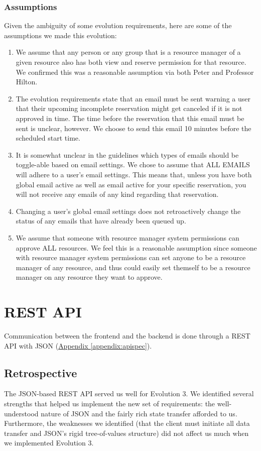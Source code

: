 \documentclass[12pt]{article}
\begin{document}
\subsubsection{Assumptions}
Given the ambiguity of some evolution requirements, here are some of the assumptions we made this evolution:
\begin{enumerate}
    \item We assume that any person or any group that is a resource manager of a given resource also has both view and reserve permission for that resource. We confirmed this was a reasonable assumption via both Peter and Professor Hilton. 
    \item The evolution requirements state that an email must be sent warning a user that their upcoming incomplete reservation might get canceled if it is not approved in time. The time before the reservation that this email must be sent is unclear, however. We choose to send this email 10 minutes before the scheduled start time. 
    \item It is somewhat unclear in the guidelines which types of emails should be toggle-able based on email settings. We chose to assume that ALL EMAILS will adhere to a user's email settings. This means that, unless you have both global email active as well as email active for your specific reservation, you will not receive any emails of any kind regarding that reservation. 
    \item Changing a user's global email settings does not retroactively change the status of any emails that have already been queued up. 
    \item We assume that someone with resource manager system permissions can approve ALL resources. We feel this is a reasonable assumption since someone with resource manager system permissions can set anyone to be a resource manager of any resource, and thus could easily set themself to be a resource manager on any resource they want to approve. 
\end{enumerate}



\section{REST API}
\label{sec:REST}
Communication between the frontend and the backend is done through a REST API with JSON (\hyperref[appendix:apispec]{Appendix \ref{appendix:apispec}}).

\subsection{Retrospective}
The JSON-based REST API served us well for Evolution 3. We identified several strengths that helped us implement the new set of requirements: the well-understood nature of JSON and the fairly rich state transfer afforded to us. Furthermore, the weaknesses we identified (that the client must initiate all data transfer and JSON's rigid tree-of-values structure) did not affect us much when we implemented Evolution 3.
\end{document}
